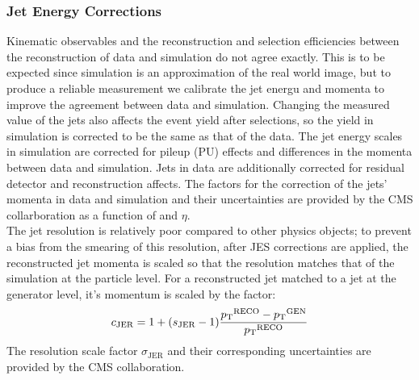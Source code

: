 \subsubsection{Jet Energy Corrections}\label{JEC}
Kinematic observables and the reconstruction and selection efficiencies between the reconstruction of data and simulation do not agree exactly. This is to be expected since simulation is an approximation of the real world image, but to produce a reliable measurement we calibrate the jet energu and momenta to improve the agreement between data and simulation. Changing the measured value of the jets also affects the event yield after selections, so the yield in simulation is corrected to be the same as that of the data. The jet energy scales in simulation are corrected for pileup (PU) effects and differences in the momenta between data and simulation. Jets in data are additionally corrected for residual detector and reconstruction affects. The factors for the correction of the jets' momenta in data and simulation and their uncertainties are provided by the CMS collarboration as a function of \pt and $\eta$.\\
The jet \pt resolution is relatively poor compared to other physics objects; to prevent a bias from the smearing of this resolution, after JES corrections are applied, the reconstructed jet momenta is scaled so that the resolution matches that of the simulation at the particle level. For a reconstructed jet matched to a jet at the generator level, it's momentum is scaled by the factor:
\begin{equation}
  \label{eq:JER}
  c_{\textrm{JER}}=1+(s_{\textrm{JER}}-1)\frac{{p_{\mathrm{T}}}^{\textrm{RECO}}-{p_{\mathrm{T}}}^{\textrm{GEN}}}{{p_{\mathrm{T}}}^{\textrm{RECO}}}
\end{equation}
The resolution scale factor $\sigma_{\textrm{JER}}$ and their corresponding uncertainties are provided by the CMS collaboration.
